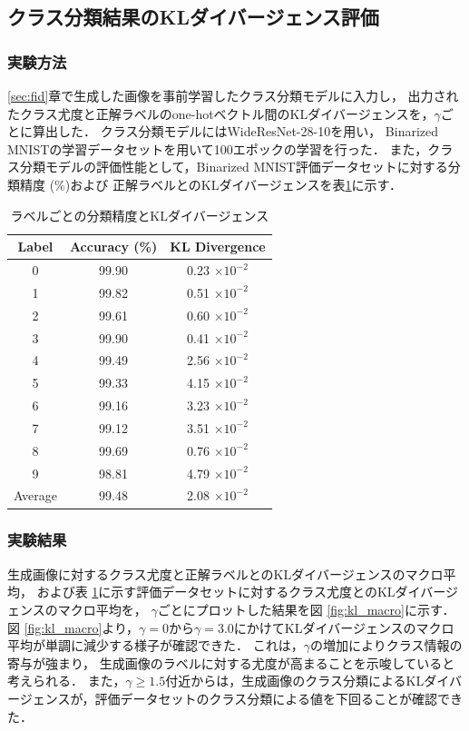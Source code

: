 \documentclass[11pt]{jsarticle}  %
\begin{document}
\subsection{クラス分類結果のKLダイバージェンス評価}

\subsubsection{実験方法}
\ref{sec:fid}章で生成した画像を事前学習したクラス分類モデルに入力し，
出力されたクラス尤度と正解ラベルのone-hotベクトル間のKLダイバージェンスを，$\gamma$ごとに算出した．
クラス分類モデルにはWideResNet-28-10\cite{WRN}を用い，
Binarized MNISTの学習データセットを用いて100エポックの学習を行った．
また，クラス分類モデルの評価性能として，Binarized MNIST評価データセットに対する分類精度 (\%)および
正解ラベルとのKLダイバージェンスを表\ref{tbl:classifier_acc_kl}に示す．
\begin{table}[htbp]
  \centering
  \caption{ラベルごとの分類精度とKLダイバージェンス}
  \begin{tabular}{ccc}
    \hline
    Label & Accuracy (\%) & KL Divergence \\
    \hline
    0 & 99.90 & 0.23 $\times 10^{-2}$\\
    1 & 99.82 & 0.51 $\times 10^{-2}$\\
    2 & 99.61 & 0.60 $\times 10^{-2}$\\
    3 & 99.90 & 0.41 $\times 10^{-2}$\\
    4 & 99.49 & 2.56 $\times 10^{-2}$\\
    5 & 99.33 & 4.15 $\times 10^{-2}$\\
    6 & 99.16 & 3.23 $\times 10^{-2}$\\
    7 & 99.12 & 3.51 $\times 10^{-2}$\\
    8 & 99.69 & 0.76 $\times 10^{-2}$\\
    9 & 98.81 & 4.79 $\times 10^{-2}$\\
    \hline
    Average & 99.48 & 2.08 $\times 10^{-2}$\\
    \hline
  \end{tabular}
  \label{tbl:classifier_acc_kl}
\end{table}

\subsubsection{実験結果}
生成画像に対するクラス尤度と正解ラベルとのKLダイバージェンスのマクロ平均，
および表 \ref{tbl:classifier_acc_kl}に示す評価データセットに対するクラス尤度とのKLダイバージェンスのマクロ平均を，
$\gamma$ごとにプロットした結果を図 \ref{fig:kl_macro}に示す．
図 \ref{fig:kl_macro}より，$\gamma=0$から$\gamma=3.0$にかけてKLダイバージェンスのマクロ平均が単調に減少する様子が確認できた．
これは，$\gamma$の増加によりクラス情報の寄与が強まり，
生成画像のラベルに対する尤度が高まることを示唆していると考えられる．
また，$\gamma \geq 1.5$付近からは，生成画像のクラス分類によるKLダイバージェンスが，評価データセットのクラス分類による値を下回ることが確認できた．
\end{document}
